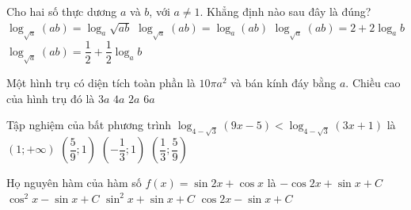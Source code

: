 \begin{ex}%
Cho hai số thực dương $a$ và $b$, với $a\neq 1$. Khẳng định nào sau đây là đúng?
	\choice
	{$\log_{\sqrt{a}}\left(ab\right) = \log_{a}\sqrt{ab}$}
	{$\log_{\sqrt{a}}\left(ab\right) = \log_{a}\left(ab\right)$}
	{\True $\log_{\sqrt{a}}\left(ab\right) = 2 + 2\log_{a}b$}
	{$\log_{\sqrt{a}}\left(ab\right) = \dfrac{1}{2}+ \dfrac{1}{2}\log_{a}b$}
\end{ex}

\begin{ex}%
Một hình trụ có diện tích toàn phần là $10\pi a^{2}$ và bán kính đáy bằng $a$. Chiều cao của hình trụ đó là 
	\choice
	{$3a$}
	{\True $4a$}
	{$2a$}
	{$6a$}
\end{ex}

\begin{ex}%
Tập nghiệm của bất phương  trình $\log_{4 - \sqrt{3}}\left(9x - 5\right) < \log_{4 - \sqrt{3}}\left(3x + 1\right)$ là 
\choice
	{$\left(1; + \infty\right)$}
	{\True $\left(\dfrac{5}{9}; 1\right)$}
	{$\left(- \dfrac{1}{3}; 1\right)$}
	{$\left(\dfrac{1}{3}; \dfrac{5}{9}\right)$}
\end{ex}

\begin{ex}%
Họ nguyên hàm của hàm số $f\left(x\right) = \sin 2x + \cos x$ là 
	\choice
	{$- \cos 2x + \sin x + C$}
	{$\cos^2x - \sin x + C$}
	{\True $\sin^2x + \sin x + C$}
	{$\cos 2x - \sin x + C$}
\end{ex}

